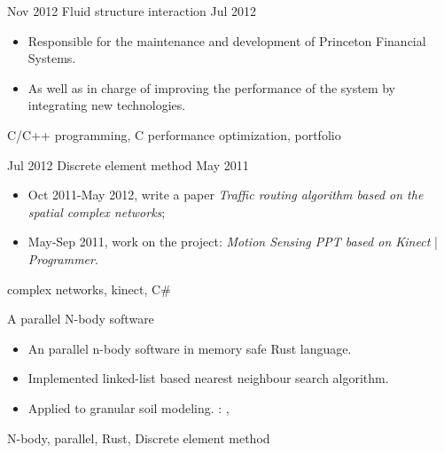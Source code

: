 \begin{experiences}
  \emptySeparator
  \experience
  {Nov 2012} {Fluid structure interaction}{}{}
  {Jul 2012 }    {
    \begin{itemize}
    \item  Responsible for the maintenance and development of Princeton Financial Systems.
    \item As well as in charge of improving the performance of the system by integrating new technologies.
    \end{itemize}
  }
  {C/C++ programming, C performance optimization, portfolio}

  \emptySeparator
  \experience
  {Jul 2012} {Discrete element method}{}{}
  {May 2011 }    {
    \begin{itemize}
    \item  Oct 2011-May 2012, write a paper \emph{Traffic routing algorithm based on the spatial complex networks};
    \item  May-Sep 2011, work on the project: \emph{Motion Sensing PPT based on Kinect} | \emph{Programmer}.
    \end{itemize}
  }
  {complex networks, kinect, C\#}

  \emptySeparator
  \experience
  {}   {A parallel N-body software}{}{}
  {} {
    \begin{itemize}
    \item An parallel n-body software in memory safe Rust language.
    \item Implemented linked-list based nearest neighbour search algorithm.
    \item Applied to granular soil modeling.
    \faGithub: ,
    \end{itemize}
  }
  {N-body, parallel, Rust, Discrete element method}


\end{experiences}

